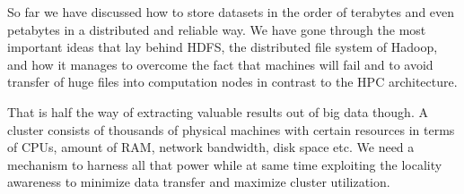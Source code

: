 So far we have discussed how to store datasets in the order of
terabytes and even petabytes in a distributed
and reliable way. We have gone through the most important ideas that
lay behind HDFS, the distributed file system of Hadoop, and how it
manages to overcome the fact that machines will fail and to avoid
transfer of huge files into computation nodes in contrast to the HPC
architecture.

That is half the way of extracting valuable results out of big data
though. A cluster consists of thousands of physical machines with
certain resources in terms of CPUs, amount of RAM, network bandwidth,
disk space etc. We need a mechanism to harness all that power while at
same time exploiting the locality awareness to minimize data transfer
and maximize cluster utilization.